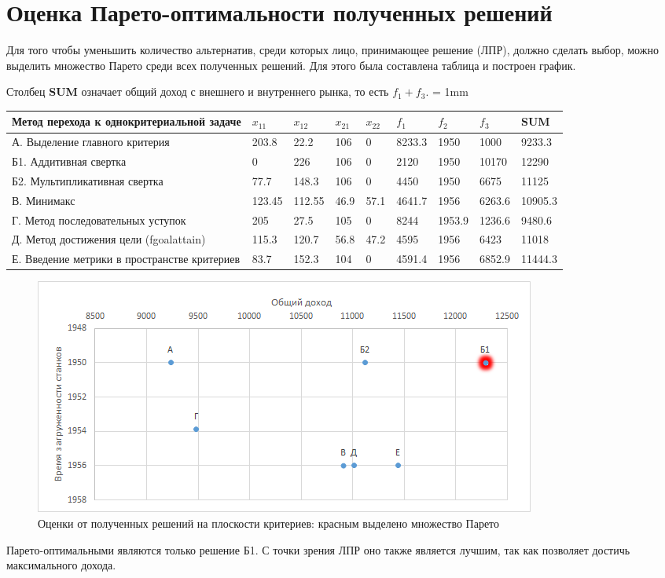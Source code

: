 \section{Оценка Парето-оптимальности полученных решений}
Для того чтобы уменьшить количество альтернатив, среди которых лицо, принимающее решение (ЛПР), должно сделать выбор, можно выделить множество Парето среди всех полученных решений. Для этого была составлена таблица и построен график.


Столбец \textbf{SUM} означает общий доход с внешнего и внутреннего рынка, то есть $f_1+f_3$.
\tabulinesep = 1mm
\begin{longtabu} to \textwidth {|X[3, c , m ] |X[c , m ] | X[ c , m ]|X[ c , m ]|X[ c , m ]|X[ c , m ]|X[ c , m ]|X[ c , m ]|X[1.5, c , m ]|}\firsthline\hline
\textbf{Метод перехода к однокритериальной задаче}&\textbf{$x_{11}$}&\textbf{$x_{12}$}&\textbf{$x_{21}$}&\textbf{$x_{22}$}&\textbf{$f_1$}&\textbf{$f_2$}&\textbf{$f_3$}&\textbf{SUM}\\ \hline \endfirsthead
А. Выделение главного критерия&203.8&22.2&106&0&8233.3&1950&1000&9233.3\\ \hline
Б1. Аддитивная свертка&0&226&106&0&2120&1950&10170&12290\\ \hline
Б2. Мультипликативная свертка&77.7&148.3&106&0&4450&1950&6675&11125\\ \hline
В. Минимакс&123.45&112.55&46.9&57.1&4641.7&1956&6263.6&10905.3\\ \hline
Г. Метод последовательных уступок &205&27.5&105&0&8244&1953.9&1236.6&9480.6\\ \hline
Д. Метод достижения цели (fgoalattain) &115.3&120.7&56.8&47.2&4595&1956&6423&11018\\ \hline
Е. Введение метрики в пространстве критериев&83.7&152.3&104&0&4591.4&1956&6852.9&11444.3\\ \hline
\end{longtabu}
\begin{figure}[H]
	\includegraphics[width=\textwidth]{img/1}
	\caption{Оценки от полученных решений на плоскости критериев: красным выделено множество Парето}
\end{figure}  
Парето-оптимальными являются только решение Б1. С точки зрения ЛПР оно также является лучшим, так как позволяет достичь максимального дохода.


